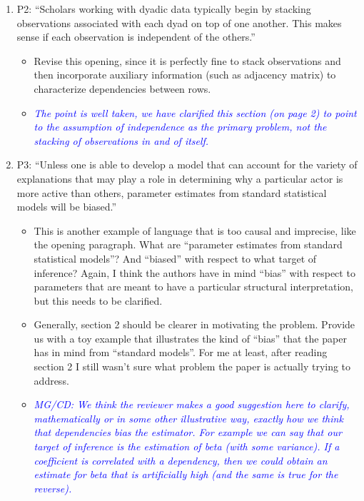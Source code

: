 \begin{enumerate}
\begin{itemize}
	\end{itemize}
	\item P2: “Scholars working with dyadic data typically begin by stacking observations associated with each dyad on top of one another. This makes sense if each observation is independent of the others.”
	\begin{itemize}
		\item Revise this opening, since it is perfectly fine to stack observations and then incorporate auxiliary information (such as adjacency matrix) to characterize dependencies between rows.
	\end{itemize}
	\begin{itemize}
		\item {\emph{\textcolor{blue}{
		 The point is well taken, we have clarified this section (on page 2) to point to the assumption of independence as the primary problem, not the stacking of observations in and of itself.
		}}}
	\end{itemize}
	\item P3: “Unless one is able to develop a model that can account for the variety of explanations that may play a role in determining why a particular actor is more active than others, parameter estimates from standard statistical models will be biased.”
	\begin{itemize}
		\item This is another example of language that is too causal and imprecise, like the opening paragraph. What are “parameter estimates from standard statistical models”?  And “biased” with respect to what target of inference? Again, I think the authors have in mind “bias” with respect to parameters that are meant to have a particular structural interpretation, but this needs to be clarified.
		\item Generally, section 2 should be clearer in motivating the problem.  Provide us with a toy example that illustrates the kind of “bias” that the paper has in mind from “standard models”.  For me at least, after reading section 2 I still wasn’t sure what problem the paper is actually trying to address.
		\item \textcolor{blue}{ \emph{ MG/CD: We think the reviewer makes a good suggestion here to clarify, mathematically or in some other illustrative way, exactly how we think that dependencies bias the estimator. For example we can say that our target of inference is the estimation of beta (with some variance). If a coefficient is correlated with a dependency, then we could obtain an estimate for beta that is artificially high (and the same is true for the reverse).}}

\end{itemize}
\end{enumerate}
